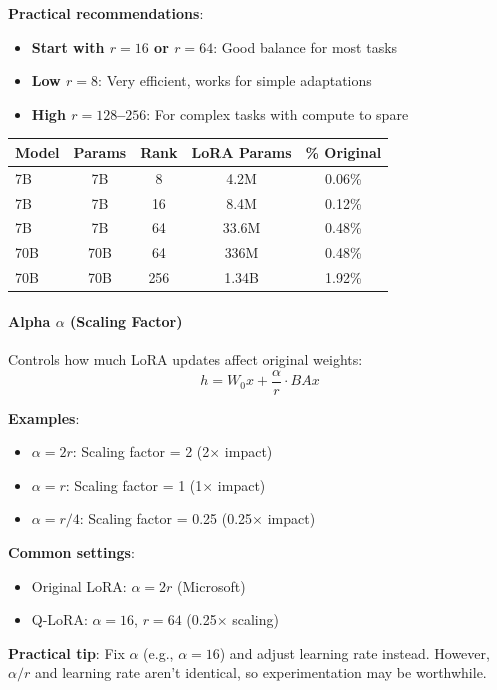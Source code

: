 \documentclass{article}
\begin{document}
\textbf{Practical recommendations}:
\begin{itemize}
\item \textbf{Start with $r=16$ or $r=64$}: Good balance for most tasks
\item \textbf{Low $r=8$}: Very efficient, works for simple adaptations
\item \textbf{High $r=128$--$256$}: For complex tasks with compute to spare
\end{itemize}

\begin{center}
\begin{tabular}{lcccc}
\toprule
\textbf{Model} & \textbf{Params} & \textbf{Rank} & \textbf{LoRA Params} & \textbf{\% Original} \\
\midrule
7B & 7B & 8 & 4.2M & 0.06\% \\
7B & 7B & 16 & 8.4M & 0.12\% \\
7B & 7B & 64 & 33.6M & 0.48\% \\
70B & 70B & 64 & 336M & 0.48\% \\
70B & 70B & 256 & 1.34B & 1.92\% \\
\bottomrule
\end{tabular}
\end{center}

\paragraph{Alpha $\alpha$ (Scaling Factor)}

Controls how much LoRA updates affect original weights:
\[
h = W_0x + \frac{\alpha}{r} \cdot BAx
\]

\textbf{Examples}:
\begin{itemize}
\item $\alpha = 2r$: Scaling factor = 2 (2$\times$ impact)
\item $\alpha = r$: Scaling factor = 1 (1$\times$ impact)
\item $\alpha = r/4$: Scaling factor = 0.25 (0.25$\times$ impact)
\end{itemize}

\textbf{Common settings}:
\begin{itemize}
\item Original LoRA: $\alpha = 2r$ (Microsoft)
\item Q-LoRA: $\alpha = 16$, $r = 64$ (0.25$\times$ scaling)
\end{itemize}

\textbf{Practical tip}: Fix $\alpha$ (e.g., $\alpha=16$) and adjust learning rate instead. However, $\alpha/r$ and learning rate aren't identical, so experimentation may be worthwhile.
\end{document}
